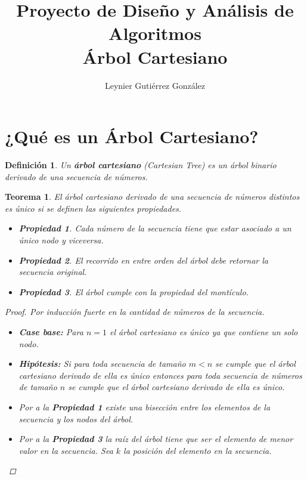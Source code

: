 \documentclass[12pt]{article}
\title{Proyecto de Diseño y Análisis de Algoritmos\\ \vspace{.2cm} \textbf{Árbol Cartesiano}}
\author{Leynier Gutiérrez González}
\newcommand{\ct}{árbol cartesiano }
\newtheorem{theorem}{Teorema}
\newtheorem{definition}{Definición}
\newtheorem{proof}{Demostración}
\newtheorem{propertie}{Propiedad}
\begin{document}
\maketitle

\newpage

\section{¿Qué es un Árbol Cartesiano?}

\begin{definition}
	Un \textbf{\ct}(Cartesian Tree) es un árbol binario derivado de una secuencia de números.
\end{definition}

\begin{theorem}
	El \ct derivado de una secuencia de números distintos es único si se definen las siguientes propiedades.
	\begin{itemize}
		\item \begin{propertie} Cada número de la secuencia tiene que estar asociado a un único nodo y viceversa. \end{propertie}
		\item \begin{propertie} El recorrido en entre orden del árbol debe retornar la secuencia original. \end{propertie}
		\item \begin{propertie} El árbol cumple con la propiedad del montículo. \end{propertie}
	\end{itemize}
	\begin{proof}
		Por inducción fuerte en la cantidad de números de la secuencia.
		\begin{itemize}
			\item \textbf{Case base:} Para $n = 1$ el \ct es único ya que contiene un solo nodo.
			\item \textbf{Hipótesis:} Si para toda secuencia de tamaño $m < n$ se cumple que el \ct derivado de ella es único entonces para toda secuencia de números de tamaño $n$ se cumple que el \ct derivado de ella es único.
			\item Por a la \textbf{Propiedad 1} existe una bisección entre los elementos de la secuencia y los nodos del árbol.
			\item Por a la \textbf{Propiedad 3} la raíz del árbol tiene que ser el elemento de menor valor en la secuencia. Sea $k$ la posición del elemento en la secuencia.

\end{itemize}
\end{proof}
\end{theorem}
\end{document}
